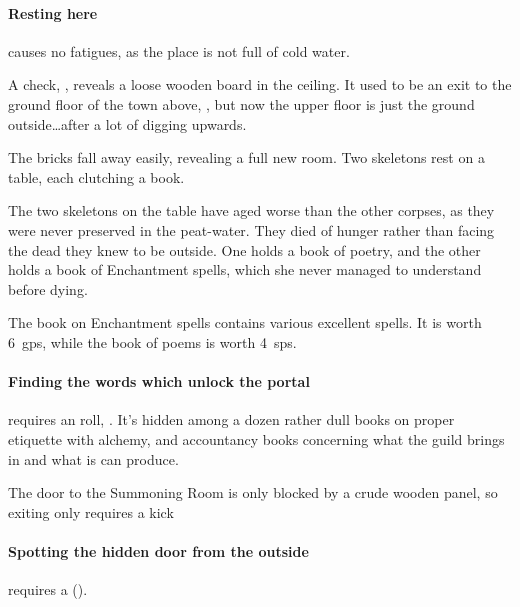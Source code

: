 \paragraph{Resting here}
causes no \glspl{fatigue}, as the place is not full of cold water.

A  check, \tn[10], reveals a loose wooden board in the ceiling.
It used to be an exit to the ground floor of the town above, , but now the upper floor is just the ground outside\ldots after a lot of digging upwards.

\begin{boxtext}

  The bricks fall away easily, revealing a full new room.  Two skeletons rest on a table, each clutching a book.

\end{boxtext}


\begin{exampletext}
  The two skeletons on the table have aged worse than the other corpses, as they were never preserved in the peat-water.
  They died of hunger rather than facing the dead they knew to be outside.
  One holds a book of poetry, and the other holds a book of Enchantment spells, which she never managed to understand before dying.
\end{exampletext}

The book on Enchantment spells contains various excellent spells.
It is worth 6~\glspl{gp}, while the book of poems is worth 4~\glspl{sp}.

\paragraph{Finding the words which unlock the portal}
requires an  roll, \tn[9].
It's hidden among a dozen rather dull books on proper etiquette with alchemy, and accountancy books concerning what the guild brings in and what is can produce.

The door to the Summoning Room is only blocked by a crude wooden panel, so exiting only requires a kick

\paragraph{Spotting the hidden door from the outside}
requires a  (\tn[8]).

